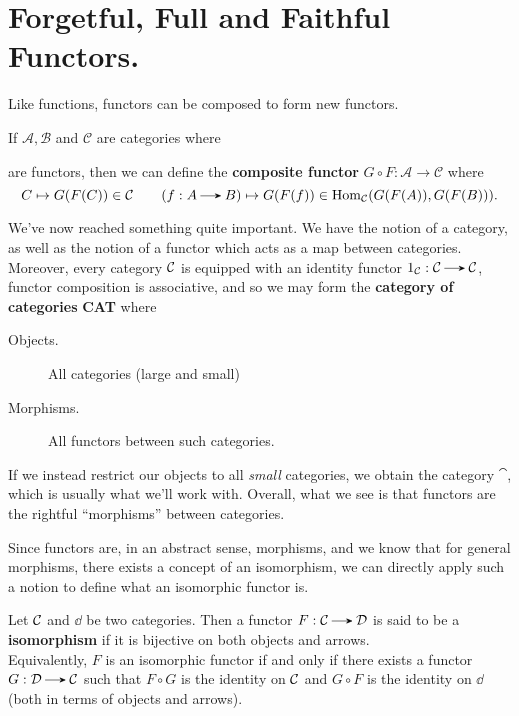     \newpage
    \section{Forgetful, Full and Faithful Functors.}

    Like functions, functors can be composed to form new functors.
    \begin{definition}
        If $\mathcal{A}, \mathcal{B}$ and $\mathcal{C}$ are categories
        where 
        \begin{center}
        \end{center}
        are functors, then we can define the \textbf{composite
        functor} $G \circ F: \mathcal{A} \to \mathcal{C}$ where 
        \[
            C \mapsto G(F(C)) \in \cc \quad\quad (f: A \to B) \mapsto G(F(f)) \in \hom_{\cc}(G(F(A)), G(F(B))).
        \]
    \end{definition}
    We've now reached something quite important. We have the notion of 
    a category, as well as the notion of a functor which acts as a map between 
    categories. Moreover, every category $\mathcal{C}$ is equipped with an identity functor 
    $1_{\cc}: \cc \to \cc$, functor composition is associative, and so we  may 
    form the \textbf{category of categories} \textbf{CAT} where 
    \begin{description}
        \item[Objects.] All categories (large and small)
        \item[Morphisms.] All functors between such categories.  
    \end{description}
    If we instead restrict our objects to all \emph{small} categories, 
    we obtain the category $\cat$, which is usually what we'll work with.
    \textcolor{NavyBlue}{Overall, what we see is that  
    functors are the rightful ``morphisms'' between categories.}

    Since functors are, in an abstract sense, morphisms, and we know that for general 
    morphisms, there exists a concept of an isomorphism, we can directly apply 
    such a notion to define what an isomorphic functor is.

    \begin{definition}
        Let $\mathcal{C}$ and $\dd$ be two categories. Then a functor $F: \cc
        \to \dd$ is said to be a \textbf{isomorphism} if it is
        bijective on both objects and arrows.
        \\

        Equivalently, $F$ is an isomorphic functor if and only if there exists a
        functor $G : \dd \to \cc$ such that $F \circ G$ is the
        identity on $\mathcal{C}$ and $G \circ F$ is the identity on $\dd$
        (both in terms of objects and arrows).
    \end{definition}

